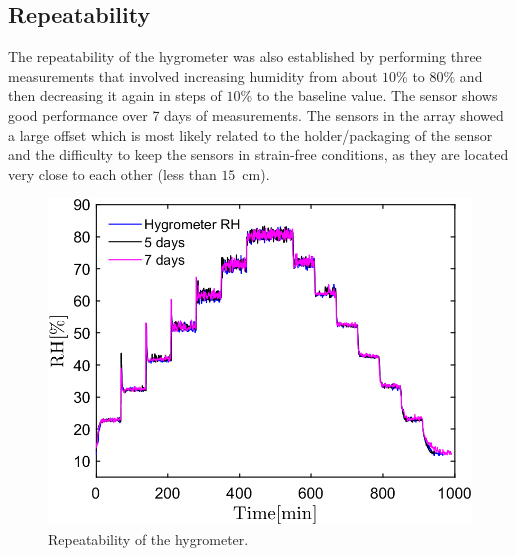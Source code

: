 \subsection{Repeatability}
The repeatability of the hygrometer was also established by performing three measurements that involved increasing humidity from about $10$\% to $80$\% and then decreasing it again in steps of $10$\% to the baseline value. The sensor shows good performance over 7 days of measurements. The sensors in the array showed a large offset which is most likely related to the holder/packaging of the sensor and the difficulty to keep the sensors in strain-free conditions, as they are located very close to each other (less than $15$~cm).
\begin{figure}[!h]
\centering
\includegraphics[width=0.6\columnwidth]{Chapter5/images/repeat.png}
\caption{Repeatability of the hygrometer.}
\label{fig_repeatability}
\end{figure}



